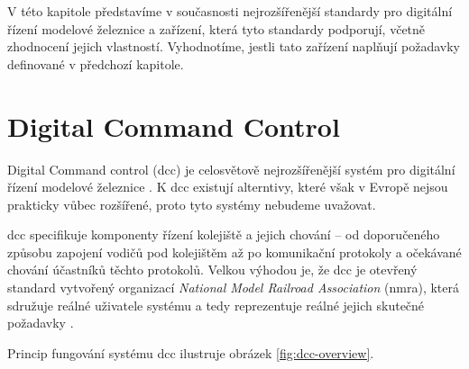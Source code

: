 V této kapitole představíme v současnosti nejrozšířenější standardy pro
digitální řízení modelové železnice a zařízení, která tyto standardy podporují,
včetně zhodnocení jejich vlastností. Vyhodnotíme, jestli tato zařízení naplňují
požadavky definované v předchozí kapitole.

\section{Digital Command Control} \label{sec:dcc}

Digital Command control (\gls{dcc}) je celosvětově nejrozšířenější systém pro
digitální řízení modelové železnice \cite{dcc_systems:web}. K \gls{dcc} existují
alterntivy, které však v Evropě nejsou prakticky vůbec rozšířené, proto tyto
systémy nebudeme uvažovat.

\gls{dcc} specifikuje komponenty řízení kolejiště a jejich chování – od
doporučeného způsobu zapojení vodičů pod kolejištěm až po komunikační protokoly
a očekávané chování účastníků těchto protokolů. Velkou výhodou je, že \gls{dcc}
je otevřený standard vytvořený organizací \textit{National Model Railroad
Association} (\gls{nmra}), která sdružuje reálné uživatele systému a tedy
reprezentuje reálné jejich skutečné požadavky \cite{dcc_specs:web}.

Princip fungování systému \gls{dcc} ilustruje obrázek \ref{fig:dcc-overview}.

